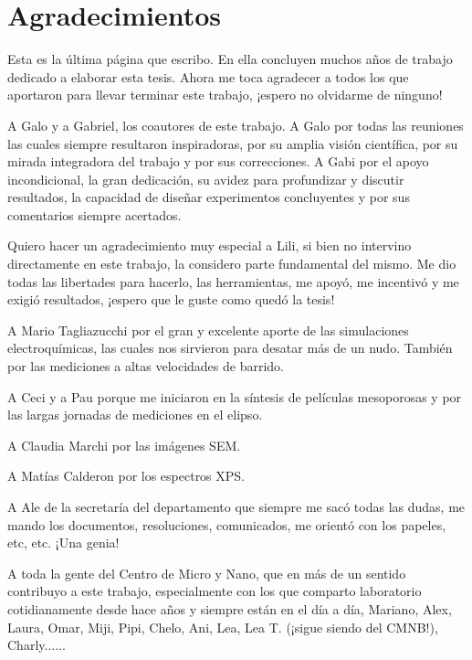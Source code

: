 \vfill
\cleardoublepage

\mtcaddchapter[Agradecimientos]	

\section*{\centering Agradecimientos} 

Esta es la última página que escribo. En ella concluyen muchos años de trabajo dedicado a elaborar esta tesis. Ahora me toca agradecer a todos los que aportaron para llevar terminar este trabajo, ¡espero no olvidarme de ninguno!\bigskip

A Galo y a Gabriel, los coautores de este trabajo. A Galo por todas las reuniones las cuales siempre resultaron inspiradoras, por su amplia visión científica, por su mirada integradora del trabajo y por sus correcciones. A Gabi por el apoyo incondicional, la gran dedicación, su avidez para profundizar y discutir resultados, la capacidad de diseñar experimentos concluyentes y por sus comentarios siempre acertados.\bigskip

Quiero hacer un agradecimiento muy especial a Lili, si bien no intervino directamente en este trabajo, la considero parte fundamental del mismo. Me dio todas las libertades para hacerlo, las herramientas, me apoyó, me incentivó y me exigió resultados, ¡espero que le guste como quedó la tesis!\bigskip

A Mario Tagliazucchi por el gran y excelente aporte de las simulaciones electroquímicas, las cuales nos sirvieron para desatar más de un nudo. También por las mediciones a altas velocidades de barrido. \bigskip

A Ceci y a Pau porque me iniciaron en la síntesis de películas mesoporosas y por las largas jornadas de mediciones en el elipso.\bigskip

A Claudia Marchi por las imágenes SEM.\bigskip

A Matías Calderon por los espectros XPS.\bigskip

A Ale de la secretaría del departamento que siempre me sacó todas las dudas, me mando los documentos, resoluciones, comunicados, me orientó con los papeles, etc, etc. ¡Una genia!\bigskip

A toda la gente del Centro de Micro y Nano, que en más de un sentido contribuyo a este trabajo, especialmente con los que comparto laboratorio cotidianamente desde hace años y siempre están en el día a día, Mariano, Alex, Laura, Omar, Miji, Pipi, Chelo, Ani, Lea, Lea T. (¡sigue siendo del CMNB!), Charly......\bigskip


